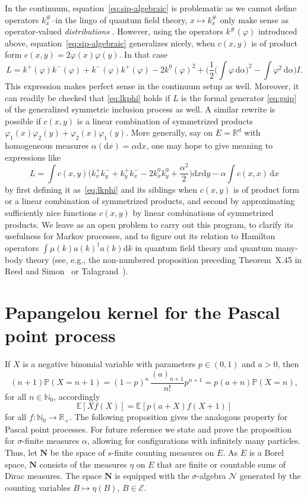 \documentclass[pdftex]{sigma}
\numberwithin{equation}{section}
\newcommand{\N}{\mathbb{N}}
\newcommand{\R}{\mathbb{R}}
\renewcommand{\P}{\mathbb{P}}
\newcommand{\E}{\mathbb{E}}
\newcommand{\dd}{\mathrm{d}} %
\newcommand{\1}{\mathbbm{1}}
\begin{document}
In the continuum, equation~\eqref{eq:sip-algebraic} is problematic as we cannot define operators $k_x^\#$--in the lingo of quantum field theory, $x\mapsto k_x^\#$ only make sense as operator-valued \emph{distributions} \cite[Sec\-tion~3.7]{talagrand-book}. However, using the operators $k^\#(\varphi)$ introduced above, equation~\eqref{eq:sip-algebraic} generalizes nicely, when $c(x,y)$ is of product form $c(x,y) = 2 \varphi(x)\varphi(y)$. In that case
\begin{equation} \label{eq:lkphi}
	L = k^+(\varphi) k^-(\varphi) + k^-(\varphi)k^+(\varphi) - 2 k^0(\varphi)^2 + \biggl( \frac{1}{2} \biggl(\int \varphi \, \dd \alpha \biggr)^2 - \int \varphi^2 \, \dd \alpha \biggr) I.
\end{equation}
This expression makes perfect sense in the continuum setup as well. Moreover, it can readily be checked that \eqref{eq:lkphi} holds if $L$ is the formal generator \eqref{eq:gsip} of the generalized symmetric inclusion process as well. A similar rewrite is possible if $c(x,y)$ is a linear combination of symmetrized products $\varphi_1(x)\varphi_2(y) + \varphi_2(x)\varphi_1(y)$. More generally, say on $E=\R^d$ with homogeneous measures $\alpha(\dd x) = \alpha \dd x$, one may hope to give meaning to expressions like
\[
	L = \int c(x,y) \biggl(k_x^+k_y^- + k_y^+ k_x^- - 2 k_x^0 k_y^0 + \frac{\alpha^2}{2} \biggr) \dd x \dd y - \alpha \int c(x,x) \, \dd x
\] 	
by first defining it as~\eqref{eq:lkphi} and its siblings when $c(x,y)$ is of product form or a linear combination of symmetrized products, and second by approximating sufficiently nice functions $c(x,y)$ by linear combinations of symmetrized products. We leave as an open problem to carry out this program, to clarify its usefulness for Markov processes, and to figure out its relation to Hamilton operators $\int \mu(k) a(k)^\dagger a(k) \dd k$ in quantum field theory and quantum many-body theory (see, e.g., the non-numbered proposition preceding Theorem~X.45 in Reed and Simon~\cite{reedSimonII} or Talagrand~\mbox{\cite[Section~3.7]{talagrand-book}}).

\section{Papangelou kernel for the Pascal point process} \label{sec:pascal}


If $X$ is a negative binomial variable with parameters $p\in (0,1)$ and $a>0$, then
\[
 (n+1)\P( X = n+1) = (1-p)^a\, \frac{(a)_{n+1}}{n!} p^{n+1} = p (a+n)\P( X = n),
\]
for all $n\in \N_0$, accordingly
\[
	\E[ X f(X)] = \E[ p(a+X) f(X+1)]
\]
for all $f\colon \N_0\to \R_+$. The following proposition gives the analogous property for Pascal point processes. For future reference we state and prove the proposition for $\sigma$-finite measures $\alpha$, allowing for configurations with infinitely many particles. Thus, let $\mathbf N$ be the space of $s$-finite counting measures on $E$. As $E$ is a Borel space, $\mathbf N$ consists of the measures $\eta$ on $E$ that are finite or countable sums of Dirac measures. The space $\mathbf N$ is equipped with the $\sigma$-algebra $\mathcal N$ generated by the counting variables $B\mapsto \eta(B)$, $B\in \mathcal E$.
\end{document}

